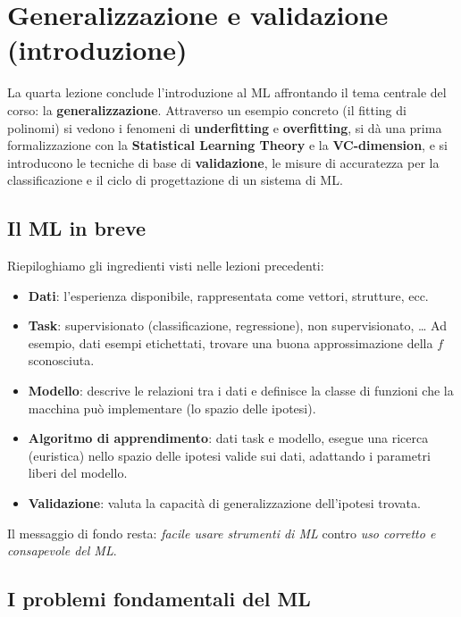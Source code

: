 \chapter{Generalizzazione e validazione (introduzione)}\label{ch-04}

La quarta lezione conclude l'introduzione al ML affrontando il tema
centrale del corso: la \textbf{generalizzazione}. Attraverso un esempio
concreto (il fitting di polinomi) si vedono i fenomeni di
\textbf{underfitting} e \textbf{overfitting}, si dà una prima
formalizzazione con la \textbf{Statistical Learning Theory} e la
\textbf{VC-dimension}, e si introducono le tecniche di base di
\textbf{validazione}, le misure di accuratezza per la classificazione e
il ciclo di progettazione di un sistema di ML.

\section{Il ML in breve}\label{il-ml-in-breve}

Riepiloghiamo gli ingredienti visti nelle lezioni precedenti:

\begin{itemize}
\tightlist
\item
  \textbf{Dati}: l'esperienza disponibile, rappresentata come vettori,
  strutture, ecc.
\item
  \textbf{Task}: supervisionato (classificazione, regressione), non
  supervisionato, \ldots{} Ad esempio, dati esempi etichettati, trovare
  una buona approssimazione della \(f\) sconosciuta.
\item
  \textbf{Modello}: descrive le relazioni tra i dati e definisce la
  classe di funzioni che la macchina può implementare (lo spazio delle
  ipotesi).
\item
  \textbf{Algoritmo di apprendimento}: dati task e modello, esegue una
  ricerca (euristica) nello spazio delle ipotesi valide sui dati,
  adattando i parametri liberi del modello.
\item
  \textbf{Validazione}: valuta la capacità di generalizzazione
  dell'ipotesi trovata.
\end{itemize}

Il messaggio di fondo resta: \emph{facile usare strumenti di ML} contro
\emph{uso corretto e consapevole del ML}.

\section{I problemi fondamentali del
ML}\label{i-problemi-fondamentali-del-ml}

